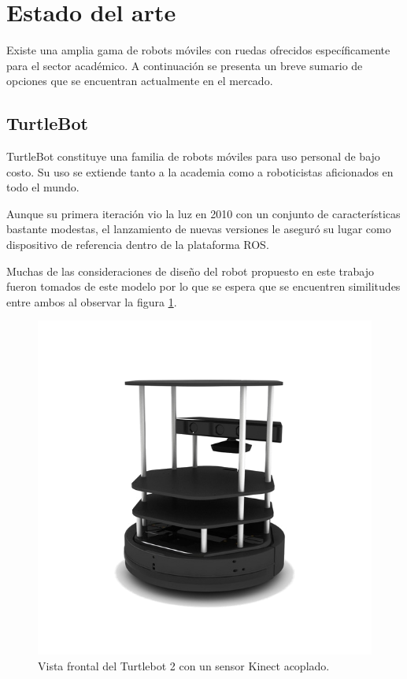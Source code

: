 \newpage

\section{Estado del arte}

Existe una amplia gama de robots móviles con ruedas ofrecidos específicamente para el sector académico. A continuación se presenta un breve sumario de opciones que se encuentran actualmente en el mercado.

\subsection{TurtleBot}\label{sec:turtlebot}

TurtleBot constituye una familia de robots móviles para uso personal de bajo costo. Su uso se extiende tanto a la academia como a roboticistas aficionados en todo el mundo.

Aunque su primera iteración vio la luz en 2010 con un conjunto de características bastante modestas, el lanzamiento de nuevas versiones le aseguró su lugar como dispositivo de referencia dentro de la plataforma ROS.

Muchas de las consideraciones de diseño del robot propuesto en este trabajo fueron tomados de este modelo por lo que se espera que se encuentren similitudes entre ambos al observar la figura \ref{fig:robotTurtlebot}.

\begin{figure}[ht]
	\centering
	\includegraphics[scale=1.5]{./Figures/turtlebot.png}
	\caption{Vista frontal del Turtlebot 2 con un sensor Kinect acoplado.\protect\footnotemark}
	\label{fig:robotTurtlebot}
\end{figure}

